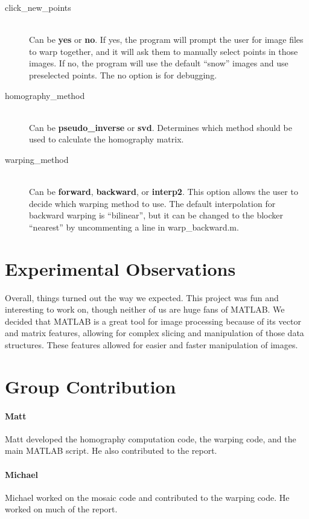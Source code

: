 \documentclass[11pt, letterpaper]{article}
\begin{document}
\begin{description}
\item[click\_new\_points] \hfill \\
  Can be {\bf yes} or {\bf no}. If yes, the program will prompt the user
  for image files to warp together, and it will ask them to manually
  select points in those images. If no, the program will use the default
  ``snow'' images and use preselected points. The no option is for
  debugging.
  
\item[homography\_method] \hfill \\
  Can be {\bf pseudo\_inverse} or {\bf svd}. Determines which method
  should be used to calculate the homography matrix.
  
\item[warping\_method] \hfill \\
  Can be {\bf forward}, {\bf backward}, or {\bf interp2}. This option
  allows the user to decide which warping method to use. The default
  interpolation for backward warping is ``bilinear'', but it can be
  changed to the blocker ``nearest'' by uncommenting a line in
  warp\_backward.m.
\end{description}


\section{Experimental Observations}
Overall, things turned out the way we expected. This project was fun
and interesting to work on, though neither of us are huge fans of
MATLAB. We decided that MATLAB is a great tool for image processing
because of its vector and matrix features, allowing for complex
slicing and manipulation of those data structures. These features
allowed for easier and faster manipulation of images.


\section{Group Contribution}
\paragraph{Matt}
Matt developed the homography computation code, the warping code, and
the main MATLAB script. He also contributed to the report.

\paragraph{Michael}
Michael worked on the mosaic code and contributed to the warping
code. He worked on much of the report.
\end{document}
